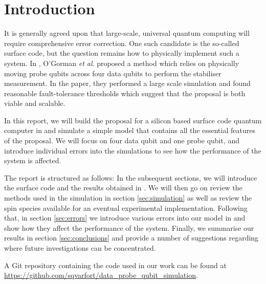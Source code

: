 \section{Introduction} \label{sec:introduction}

It is generally agreed upon that large-scale, universal quantum computing will require comprehensive error correction. One such candidate is the so-called surface code, but the question remains how to physically implement such a system. In \cite{OGorman2016}, O'Gorman \textit{et al}. proposed a method which relies on physically moving probe qubits across four data qubits to perform the stabiliser measurement. In the paper, they performed a large scale simulation and found reasonable fault-tolerance thresholds which suggest that the proposal is both viable and scalable. 

In this report, we will build the proposal for a silicon based surface code quantum computer in  \cite{OGorman2016} and simulate a simple model that contains all the essential features of the proposal. We will focus on four data qubit and one probe qubit, and introduce individual errors into the simulations to see how the performance of the system is affected. 

The report is structured as follows: In the subsequent sections, we will introduce the surface code and the results obtained in \citet{OGorman2016}. We will then go on review the methods used in the simulation in section \@ \ref{sec:simulation} as well as review the spin species available for an eventual experimental implementation. Following that, in section \@ \ref{sec:errors} we introduce various errors into our model in and show how they affect the performance of the system. Finally, we summarise our results in section \@ \ref{sec:conclusions} and provide a number of suggestions regarding where future investigations can be concentrated. 

A Git repository containing the code used in our work can be found at \url{https://github.com/sqvarfort/data_probe_qubit_simulation}. 

